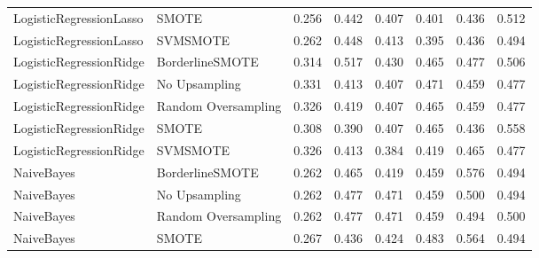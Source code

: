 \begin{tabular}{llllllll}
     LogisticRegressionLasso &               SMOTE &     0.256 &                     0.442 &                 0.407 &                  0.401 &                                   0.436 &     0.512 \\
     LogisticRegressionLasso &            SVMSMOTE &     0.262 &                     0.448 &                 0.413 &                  0.395 &                                   0.436 &     0.494 \\
     LogisticRegressionRidge &     BorderlineSMOTE &     0.314 &                     0.517 &                 0.430 &                  0.465 &                                   0.477 &     0.506 \\
     LogisticRegressionRidge &       No Upsampling &     0.331 &                     0.413 &                 0.407 &                  0.471 &                                   0.459 &     0.477 \\
     LogisticRegressionRidge & Random Oversampling &     0.326 &                     0.419 &                 0.407 &                  0.465 &                                   0.459 &     0.477 \\
     LogisticRegressionRidge &               SMOTE &     0.308 &                     0.390 &                 0.407 &                  0.465 &                                   0.436 &     0.558 \\
     LogisticRegressionRidge &            SVMSMOTE &     0.326 &                     0.413 &                 0.384 &                  0.419 &                                   0.465 &     0.477 \\
                  NaiveBayes &     BorderlineSMOTE &     0.262 &                     0.465 &                 0.419 &                  0.459 &                                   0.576 &     0.494 \\
                  NaiveBayes &       No Upsampling &     0.262 &                     0.477 &                 0.471 &                  0.459 &                                   0.500 &     0.494 \\
                  NaiveBayes & Random Oversampling &     0.262 &                     0.477 &                 0.471 &                  0.459 &                                   0.494 &     0.500 \\
                  NaiveBayes &               SMOTE &     0.267 &                     0.436 &                 0.424 &                  0.483 &                                   0.564 &     0.494 \\

\end{tabular}
